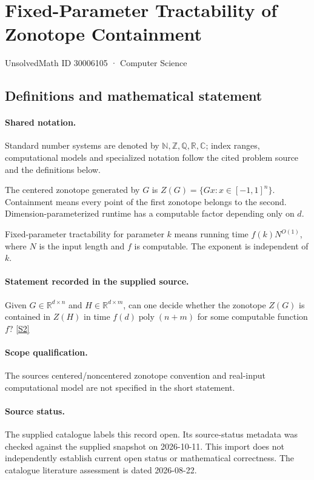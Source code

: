\documentclass[11pt]{article}
\newcommand{\sref}[2]{\hyperlink{source:#1:#2}{[S#2]}}
\begin{document}
\setcounter{section}{30006104}
\section{Fixed-Parameter Tractability of Zonotope Containment}\label{30006105}
{\small\sffamily UnsolvedMath ID 30006105 · Computer Science}
\subsection{Definitions and mathematical statement}

\paragraph{Shared notation.}Standard number systems are denoted by $\mathbb N,\mathbb Z,\mathbb Q,\mathbb R,\mathbb C$; index ranges, computational models and specialized notation follow the cited problem source and the definitions below.


The centered zonotope generated by $G$ is $Z(G)=\{Gx:x\in[-1,1]^n\}$. Containment means every point of the first zonotope belongs to the second. Dimension-parameterized runtime has a computable factor depending only on $d$.

Fixed-parameter tractability for parameter $k$ means running time $f(k)N^{O(1)}$, where $N$ is the input length and $f$ is computable. The exponent is independent of $k$.
\paragraph{Statement recorded in the supplied source.}
Given $G\in\mathbb R^{d\times n}$ and $H\in\mathbb R^{d\times m}$, can one decide whether the zonotope $Z(G)$ is contained in $Z(H)$ in time $f(d)\operatorname{poly}(n+m)$ for some computable function $f$? \sref{30006105}{2}
\paragraph{Scope qualification.}
The source\textquotesingle s centered/noncentered zonotope convention and real-input computational model are not specified in the short statement.
\paragraph{Source status.}
The supplied catalogue labels this record open. Its source-status metadata was checked against the supplied snapshot on 2026-10-11. This import does not independently establish current open status or mathematical correctness. The catalogue literature assessment is dated 2026-08-22.
\end{document}
